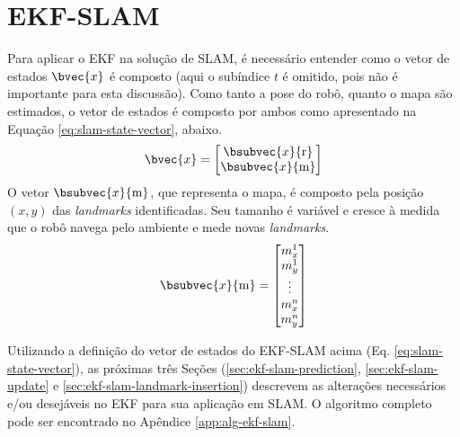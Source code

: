 \section{EKF-SLAM}
Para aplicar o EKF na solução de SLAM, é necessário entender 
como o vetor de estados $\bvec{x}$ é composto (aqui o subíndice $t$ é omitido, pois não é importante para esta discussão). Como tanto a pose do 
robô, quanto o mapa são estimados, o vetor de estados é composto por ambos como apresentado na Equação \ref{eq:slam-state-vector}, abaixo.
\begin{equation}
  \bvec{x} = \begin{bmatrix}
    \bsubvec{x}{\mathrm{r}} \\
    \bsubvec{x}{\mathrm{m}}
  \end{bmatrix}
  \label{eq:slam-state-vector}
\end{equation}
O vetor $\bsubvec{x}{\mathrm{m}}$, que representa o mapa, é composto pela posição $(x, y)$ das \textit{landmarks} identificadas. 
Seu tamanho é variável e cresce à medida que o robô navega pelo ambiente e 
mede novas \textit{landmarks}.
\begin{equation}
  \bsubvec{x}{\mathrm{m}} = \begin{bmatrix}
    m_x^1\\
    m_y^1\\
    \vdots\\
    m_x^n\\
    m_y^n
  \end{bmatrix}
  \label{eq:feature-map}
\end{equation}

Utilizando a definição do vetor de estados do EKF-SLAM acima (Eq. \ref{eq:slam-state-vector}), as próximas três Seções (\ref{sec:ekf-slam-prediction}, \ref{sec:ekf-slam-update} e \ref{sec:ekf-slam-landmark-insertion}) descrevem as alterações necessários e/ou desejáveis no EKF para sua aplicação em SLAM. O algoritmo completo pode ser encontrado no Apêndice \ref{app:alg-ekf-slam}.

